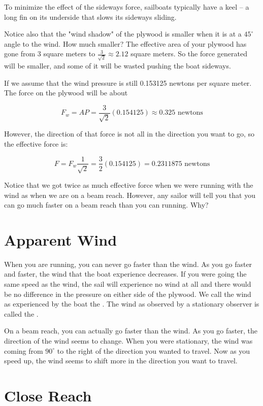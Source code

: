 To minimize the effect of the sideways force,  sailboats typically have  a keel -- a long fin on its underside that slows its sideways sliding.

Notice also that the "wind shadow" of the plywood is smaller when it is at a $45^\circ$ angle to the wind.  How much smaller?  The effective area of your plywood has 
gone from 3 square meters to $\frac{3}{\sqrt{2}} \approx 2.12$ square meters.   So the force generated will be smaller, and some of it will be wasted pushing the boat sideways.

If we assume that the wind pressure is still 0.153125 newtons per square meter.  The force on the plywood will be about

$$F_w = A P = \frac{3}{\sqrt{2}}(0.154125) \approx 0.325 \text{ newtons}$$

However,   the direction of that force is not all in the direction you want to go,  so the effective force is:

$$F = F_w \frac{1}{\sqrt{2}} =  \frac{3}{2}(0.154125) = 0.2311875 \text{ newtons}$$

Notice that we got twice as much effective force when we were running with the wind as when we are on a beam reach.   However,  any sailor will tell you that you can go much faster
on a beam reach than you can running.  Why?

\section{Apparent Wind}

When you are running,  you can never go faster than the wind.   As you go faster and faster,  the wind that the boat experience decreases.   If you were going the same speed
as the wind,  the sail will experience no wind at all and there would be no difference in the pressure on either side of the plywood.  We call the wind as experienced by the boat 
the .  The wind as observed by a stationary observer is called the .

On a beam reach,  you can actually go faster than the wind.   As you go faster,  the direction of the wind seems to change.  When you were stationary,   the wind was coming from $90^\circ$ 
to the right of the direction you wanted to travel.  Now as you speed up,  the wind seems to shift more in the direction you want to travel.

\section{Close Reach}

